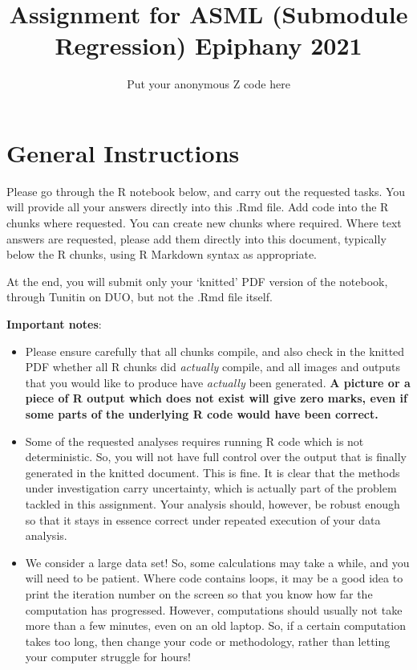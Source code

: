 \documentclass[
]{article}
\title{Assignment for ASML (Submodule Regression) Epiphany 2021}
\author{Put your anonymous Z code here}
\date{}
\begin{document}
\maketitle

\hypertarget{general-instructions}{%
\section{General Instructions}\label{general-instructions}}

Please go through the R notebook below, and carry out the requested
tasks. You will provide all your answers directly into this .Rmd file.
Add code into the R chunks where requested. You can create new chunks
where required. Where text answers are requested, please add them
directly into this document, typically below the R chunks, using R
Markdown syntax as appropriate.

At the end, you will submit only your `knitted' PDF version of the
notebook, through Tunitin on DUO, but not the .Rmd file itself.

\textbf{Important notes}:

\begin{itemize}
\item
  Please ensure carefully that all chunks compile, and also check in the
  knitted PDF whether all R chunks did \emph{actually} compile, and all
  images and outputs that you would like to produce have \emph{actually}
  been generated. \textbf{A picture or a piece of R output which does
  not exist will give zero marks, even if some parts of the underlying R
  code would have been correct.}
\item
  Some of the requested analyses requires running R code which is not
  deterministic. So, you will not have full control over the output that
  is finally generated in the knitted document. This is fine. It is
  clear that the methods under investigation carry uncertainty, which is
  actually part of the problem tackled in this assignment. Your analysis
  should, however, be robust enough so that it stays in essence correct
  under repeated execution of your data analysis.
\item
  We consider a large data set! So, some calculations may take a while,
  and you will need to be patient. Where code contains loops, it may be
  a good idea to print the iteration number on the screen so that you
  know how far the computation has progressed. However, computations
  should usually not take more than a few minutes, even on an old
  laptop. So, if a certain computation takes too long, then change your
  code or methodology, rather than letting your computer struggle for
  hours!
\end{itemize}
\end{document}
